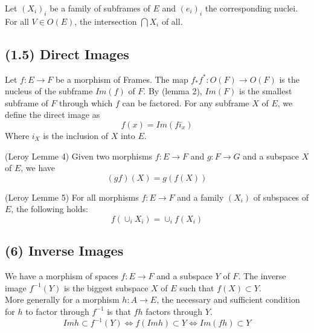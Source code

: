 \begin{definition}
    \label{def:subframe_intersection}
    \leanok
    Let $(X_i)_i$ be a family of subframes of $E$ and $(e_i)_i$ the corresponding nuclei.
    For all $V \in O(E)$, the intersection $\bigcap X_i$ of all.
\end{definition}

\subsection{(1.5) Direct Images}

\begin{definition}
    \label{def:direct_images,lem:factorisation, def:subframe_intersection}
    Let $f : E \rightarrow F$ be a morphism of Frames. The map $f_*f^* : O(F) \to O(F)$ is the nucleus of the subframe
    $Im(f)$ of $F$. By (lemma 2), $Im(F)$ is the smallest subframe of $F$ through which $f$ can be factored. For any subframe $X$ of $E$, we define the direct image as
    \[f(x) = Im(fi_x)\]
    Where $i_X$ is the inclusion of $X$ into $E$.
\end{definition}

\begin{lemma}
(Leroy Lemme 4)
    \label{lem:direct_images_transitive}
    Given two morphisms $f : E \rightarrow F$ and $g : F \rightarrow G$ and a subspace $X$ of $E$, we have
    \[(gf)(X) = g(f(X))\]
\end{lemma}

\begin{lemma}
(Leroy Lemme 5)
    \label{lem:direct_images_families}
    For all morphisms $f: E \rightarrow F$ and a family $(X_i)$ of subspaces of $E$, the following holds:
    \[f(\cup_i X_i) = \cup_i f(X_i)\]
\end{lemma}

\subsection{(6) Inverse Images}
\begin{definition}
    \label{def:inverse_images}
    We have a morphism of spaces $f : E \rightarrow F$ and a subspace $Y$ of $F$. The inverse image $f^{-1}(Y)$ is the biggest subspace $X$ of $E$ such that $f(X) \subset Y$. \\
    More generally for a morphism $h : A \rightarrow E$, the necessary and sufficient condition for $h$ to factor through $f^{-1}$ is that $fh$ factors through $Y$.
    \[Im h \subset f^{-1}(Y)\iff f(Im h) \subset Y \iff Im(fh) \subset Y \] \
\end{definition}

